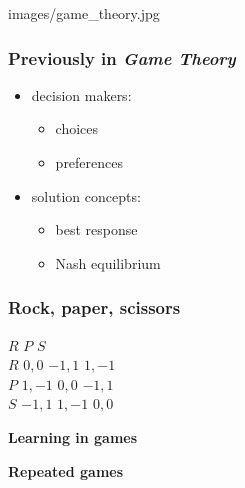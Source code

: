 
\begin{framebg}{images/game_theory.jpg}
\end{framebg}

\begin{frame}
  \frametitle{Previously in \emph{Game Theory}}

  \pause
  \begin{itemize}
  \item decision makers:
    \begin{itemize}
    \item choices
    \item preferences
    \end{itemize}
  \pause
  \item solution concepts:
    \begin{itemize}
    \item best response
    \item Nash equilibrium
    \end{itemize}
  \end{itemize}
\end{frame}

\begin{frame}
  \frametitle{Rock, paper, scissors}
  \pause
  \begin{game}{3}{3}
      \> $R$     \> $P$     \> $S$     \\
    $R$ \> $0, 0$  \> $-1, 1$ \> $1, -1$ \\
    $P$ \> $1, -1$ \> $0, 0$  \> $-1, 1$ \\
    $S$ \> $-1, 1$ \> $1, -1$ \> $0, 0$
  \end{game}

\end{frame}

\begin{framestruct}
  \Large
  \textbf{Learning in games}
  \bigskip
  \pause

  \textbf{Repeated games}
\end{framestruct}
